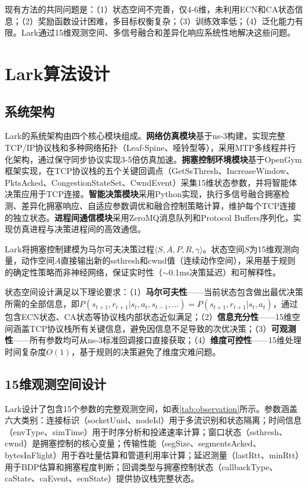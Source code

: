 \documentclass[10pt,twocolumn]{article}
\begin{document}
现有方法的共同问题是：（1）状态空间不完善，仅4-6维，未利用ECN和CA状态信息；（2）奖励函数设计困难，多目标权衡复杂；（3）训练效率低；（4）泛化能力有限。Lark通过15维观测空间、多信号融合和差异化响应系统性地解决这些问题。


\section{Lark算法设计}

\subsection{系统架构}

Lark的系统架构由四个核心模块组成。\textbf{网络仿真模块}基于ns-3\cite{ns3}构建，实现完整TCP/IP协议栈和多种网络拓扑（Leaf-Spine、哑铃型等），采用MTP多线程并行化架构，通过保守同步协议实现3-5倍仿真加速。\textbf{拥塞控制环境模块}基于OpenGym\cite{opengym}框架实现，在TCP协议栈的五个关键回调点（GetSsThresh、IncreaseWindow、PktsAcked、CongestionStateSet、CwndEvent）采集15维状态参数，并将智能体决策应用于TCP连接。\textbf{智能决策模块}采用Python实现，执行多信号融合拥塞检测、差异化拥塞响应、自适应参数调优和融合控制策略计算，维护每个TCP连接的独立状态。\textbf{进程间通信模块}采用ZeroMQ消息队列和Protocol Buffers序列化，实现仿真进程与决策进程间的高效通信。

Lark将拥塞控制建模为马尔可夫决策过程$\langle S, A, P, R, \gamma \rangle$。状态空间$S$为15维观测向量，动作空间$A$直接输出新的ssthresh和cwnd值（连续动作空间），采用基于规则的确定性策略而非神经网络，保证实时性（$\sim$0.1ms决策延迟）和可解释性。

状态空间设计满足以下理论要求：（1）\textbf{马尔可夫性}——当前状态包含做出最优决策所需的全部信息，即$P(s_{t+1}, r_{t+1} | s_t, a_t, s_{t-1}, ...) = P(s_{t+1}, r_{t+1} | s_t, a_t)$，通过包含ECN状态、CA状态等协议栈内部状态近似满足；（2）\textbf{信息充分性}——15维空间涵盖TCP协议栈所有关键信息，避免因信息不足导致的次优决策；（3）\textbf{可观测性}——所有参数均可从ns-3标准回调接口直接获取；（4）\textbf{维度可控性}——15维处理时间复杂度$O(1)$，基于规则的决策避免了维度灾难问题。

\subsection{15维观测空间设计}

Lark设计了包含15个参数的完整观测空间，如表\ref{tab:observation}所示。参数涵盖六大类别：连接标识（socketUuid、nodeId）用于多流识别和状态隔离；时间信息（envType、simTime）用于时序分析和投递速率计算；窗口状态（ssthresh、cwnd）是拥塞控制的核心变量；传输性能（segSize、segmentsAcked、bytesInFlight）用于吞吐量估算和管道利用率计算；延迟测量（lastRtt、minRtt）用于BDP估算和拥塞程度判断；回调类型与拥塞控制状态（callbackType、caState、caEvent、ecnState）提供协议栈完整状态。
\end{document}
